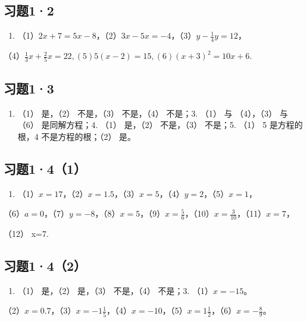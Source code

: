 \subsection{习题1·2}

\begin{enumerate}
\item
  （1）\(2x + 7 = 5x - 8\)，（2）\(3x - 5x = -4\)，（3）\(y - \frac{1}{4} y = 12\)，
\end{enumerate}

（4）\(\frac{1}{3} x + \frac{2}{5} x = 22, (5) 5(x - 2) = 15, (6) (x + 3)^2 = 10x + 6.\)

\subsection{习题1·3}

\begin{enumerate}[start=2]
\item
  （1） 是，（2） 不是，（3） 不是，（4） 不是；3. （1） 与 （4），（3）
  与 （6） 是同解方程；4. （1） 是，（2） 不是，（3） 不是；5. （1） 5
  是方程的根，4 不是方程的根；（2） 是。
\end{enumerate}

\subsection{习题1·4（1）}

\begin{enumerate}[start=2]
\item
  （1）\(x = 17\)，（2）\(x = 1.5\)，（3）\(x = 5\)，（4）\(y = 2\)，（5）\(x = 1\)，
\end{enumerate}

（6）\(a = 0\)，（7）\(y = -8\)，（8）\(x = 5\)，（9）\(x = \frac{5}{6}\)，（10）\(x = \frac{3}{10}\)，（11）\(x = 7\)，

（12） x=7.

\subsection{习题1·4（2）}

\begin{enumerate}[start=2]
\item
  （1） 是，（2） 是，（3） 不是，（4） 不是；3. （1）\(x = -15\)。
\end{enumerate}

（2）\(x = 0.7\)，（3）\(x = -1\frac{1}{5}\)，（4）\(x = -10\)，（5）\(x = 1\frac{1}{2}\)，（6）\(x = -\frac{8}{9}\)。

